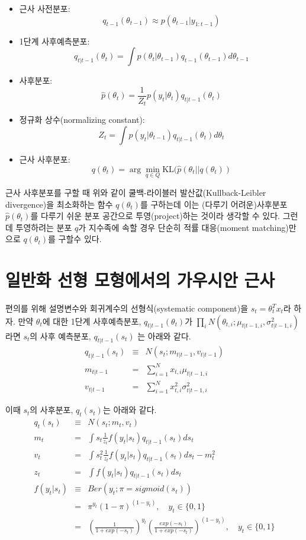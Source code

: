 \documentclass[oneside,b5paper,11pt]{book} %
\begin{document}
\begin{itemize}
\item 근사 사전분포: 
$$q_{t-1}(\theta_{t-1}) \approx p(\theta_{t-1}|y_{1:t-1})$$
\item 1단계 사후예측분포: 
$$q_{t|t-1}(\theta_t) = \int p(\theta_t | \theta_{t-1}) q_{t-1}(\theta_{t-1}) d\theta_{t-1}$$
\item 사후분포:
$$\hat{p}(\theta_t) = \frac{1}{Z_t}p(y_t | \theta_t)q_{t|t-1}(\theta_t)$$
\item 정규화 상수(normalizing constant):
$$Z_t = \int p(y_t | \theta_{t-1})q_{t|t-1}(\theta_{t})d\theta_{t}$$
\item 근사 사후분포:
$$q(\theta_t) = \arg\min_{q \in Q} \mathrm{KL}(\hat{p}(\theta_t || q(\theta_t)) $$
\end{itemize}

근사 사후분포를 구할 때 위와 같이 쿨백-라이블러 발산값(Kullback-Leibler divergence)을 최소화하는 함수 $q(\theta_t)$를 구하는데 이는 (다루기 어려운)사후분포$\hat{p}(\theta_t)$를 다루기 쉬운 분포 공간으로 투영(project)하는 것이라 생각할 수 있다. 그런데 투영하려는 분포 $q$가 지수족에 속할 경우 단순히 적률 대응(moment matching)만으로 $q(\theta_t)$를 구할수 있다.\citep{Murphy2012}


\section{일반화 선형 모형에서의 가우시안 근사}
편의를 위해 설명변수와 회귀계수의 선형식(systematic component)을 $s_t=\theta_t^T x_t$라 하자. 만약 $\theta_t$에 대한 1단계 사후예측분포, $q_{t|t-1}(\theta_t)$가 \newline 
$\prod_i N(\theta_{t,i};\mu_{t|t-1,i},\sigma^2_{t|t-1,i})$라면 $s_t$의 사후 예측분포, $q_{t|t-1}(s_t)$ 는 아래와 같다.
\begin{eqnarray}
   q_{t|t-1}(s_{t}) &\equiv& N(s_t;m_{t|t-1}, {v}_{t|t-1})
\\ m_{t|t-1} &=& \sum^N_{i=1}x_{t,i}\mu_{t|t-1,i}
\\ {v}_{t|t-1} &=& \sum^N_{i=1}x^2_{t,i}{\sigma}^2_{t|t-1,i}
\end{eqnarray}

이때 $s_t$의 사후분포, $q_t(s_t)$는 아래와 같다.
\begin{eqnarray}
q_t(s_t) &\equiv& N(s_t; m_t, v_t)
\\ m_t &=& \int s_t \frac{1}{z_t} f(y_t|s_t) q_{t|t-1}(s_t)ds_t \label{eq:10}
\\ v_t &=& \int s^2_t \frac{1}{z_t} f(y_t|s_t) q_{t|t-1}(s_t) ds_t - m_t^2 \label{eq:11}
\\ z_t &=& \int f(y_t|s_t) q_{t|t-1}(s_t)ds_t \label{eq:12}
\\ f(y_t|s_t) &\equiv& Ber(y_t;\pi = sigmoid(s_t))
\\ & =& \pi^{y_t} (1-\pi)^{(1-y_t)}, \quad y_t \in \{0,1\}
\\ & =& \left(\frac{1}{1+exp(-s_t)}\right)^{y_t} \left(\frac{exp(-s_t)}{1+exp(-s_t)}\right)^{(1-y_t)}, \quad y_t \in \{0,1\} \nonumber
\end{eqnarray}
\end{document}
